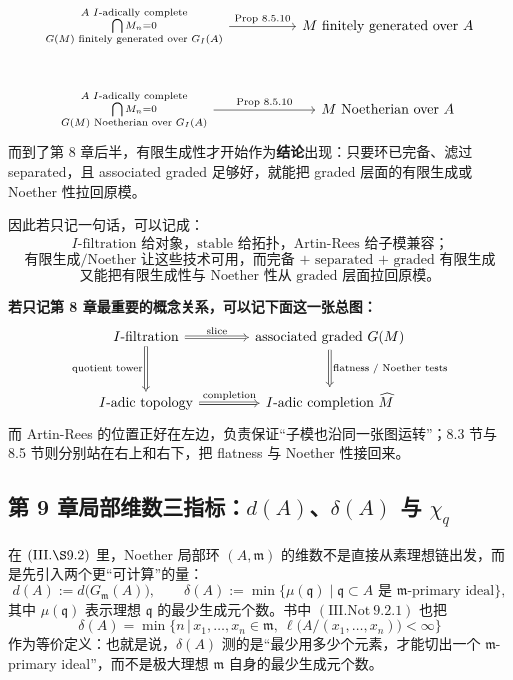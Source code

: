 \documentclass[a4paper]{ctexart}
\theoremstyle{definition}
\theoremstyle{analysis}
\theoremstyle{plain}
\begin{document}
\[
\begin{tikzcd}[column sep=huge, row sep=large]
\substack{A\text{ \(I\)-adically complete}\\ \bigcap M_n=0\\
G(M)\text{ finitely generated over }G_I(A)}
\arrow[r, "\text{Prop 8.5.10}"] &
M\text{ finitely generated over }A \\
\substack{A\text{ \(I\)-adically complete}\\ \bigcap M_n=0\\
G(M)\text{ Noetherian over }G_I(A)}
\arrow[r, "\text{Prop 8.5.10}"] &
M\text{ Noetherian over }A
\end{tikzcd}
\]
而到了第 8 章后半，有限生成性才开始作为\textbf{结论}出现：只要环已完备、滤过 separated，且 associated graded 足够好，就能把 graded 层面的有限生成或 Noether 性拉回原模。

\medskip

因此若只记一句话，可以记成：
\[
\text{\(I\)-filtration 给对象，stable 给拓扑，Artin-Rees 给子模兼容；}
\]
\[
\text{有限生成/Noether 让这些技术可用，而完备 + separated + graded 有限生成}
\]
\[
\text{又能把有限生成性与 Noether 性从 graded 层面拉回原模。}
\]

\medskip

\textbf{若只记第 8 章最重要的概念关系，可以记下面这一张总图：}
\[
\begin{tikzcd}[column sep=large, row sep=large]
\text{\(I\)-filtration} \arrow[r, Rightarrow, "\text{slice}"] \arrow[d, Rightarrow, "\text{quotient tower}"'] &
\text{associated graded }G(M) \arrow[d, Rightarrow, "\text{flatness / Noether tests}"] \\
\text{\(I\)-adic topology} \arrow[r, Rightarrow, "\text{completion}"] &
\text{\(I\)-adic completion }\widehat M
\end{tikzcd}
\]
而 Artin-Rees 的位置正好在左边，负责保证“子模也沿同一张图运转”；8.3 节与 8.5 节则分别站在右上和右下，把 flatness 与 Noether 性接回来。

\subsection{\texorpdfstring{第 9 章局部维数三指标：\(d(A)\)、\(\delta(A)\) 与 \(\chi_q\)}{第 9 章局部维数三指标}}\label{subsec:topic-local-dimension-invariants}

\label{rem:local-dimension-invariants}
在 \((\mathrm{III.\S 9.2})\) 里，Noether 局部环 \((A,\mathfrak m)\) 的维数不是直接从素理想链出发，而是先引入两个更“可计算”的量：
\[
  d(A):=d\!\bigl(G_{\mathfrak m}(A)\bigr),
  \qquad
  \delta(A):=\min\{\mu(\mathfrak q)\mid \mathfrak q\subset A\text{ 是 }\mathfrak m\text{-primary ideal}\},
\]
其中 \(\mu(\mathfrak q)\) 表示理想 \(\mathfrak q\) 的最少生成元个数。书中 \((\mathrm{III.Not}\ 9.2.1)\) 也把
\[
  \delta(A)
  =
  \min\bigl\{
    n \,\big|\,
    x_1,\dots,x_n\in \mathfrak m,\ 
    \ell\bigl(A/(x_1,\dots,x_n)\bigr)<\infty
  \bigr\}
\]
作为等价定义：也就是说，\(\delta(A)\) 测的是“最少用多少个元素，才能切出一个 \(\mathfrak m\)-primary ideal”，而不是极大理想 \(\mathfrak m\) 自身的最少生成元个数。
\end{document}
